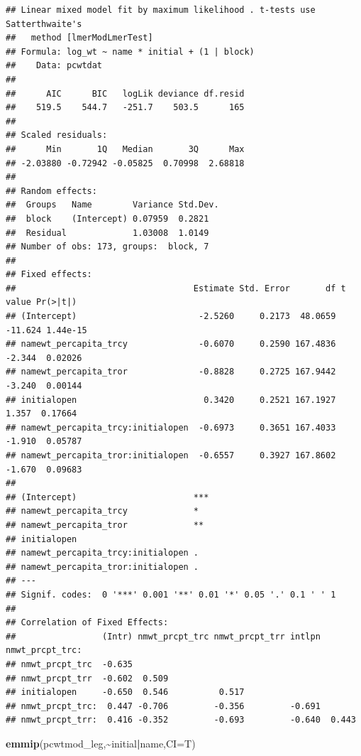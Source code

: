 \documentclass[
]{article}
\newenvironment{Shaded}{\begin{snugshade}}{\end{snugshade}}
\newcommand{\AttributeTok}[1]{\textcolor[rgb]{0.13,0.29,0.53}{#1}}
\newcommand{\FunctionTok}[1]{\textcolor[rgb]{0.13,0.29,0.53}{\textbf{#1}}}
\newcommand{\NormalTok}[1]{#1}
\newcommand{\SpecialCharTok}[1]{\textcolor[rgb]{0.81,0.36,0.00}{\textbf{#1}}}
\begin{document}
\begin{verbatim}
## Linear mixed model fit by maximum likelihood . t-tests use Satterthwaite's
##   method [lmerModLmerTest]
## Formula: log_wt ~ name * initial + (1 | block)
##    Data: pcwtdat
## 
##      AIC      BIC   logLik deviance df.resid 
##    519.5    544.7   -251.7    503.5      165 
## 
## Scaled residuals: 
##      Min       1Q   Median       3Q      Max 
## -2.03880 -0.72942 -0.05825  0.70998  2.68818 
## 
## Random effects:
##  Groups   Name        Variance Std.Dev.
##  block    (Intercept) 0.07959  0.2821  
##  Residual             1.03008  1.0149  
## Number of obs: 173, groups:  block, 7
## 
## Fixed effects:
##                                   Estimate Std. Error       df t value Pr(>|t|)
## (Intercept)                        -2.5260     0.2173  48.0659 -11.624 1.44e-15
## namewt_percapita_trcy              -0.6070     0.2590 167.4836  -2.344  0.02026
## namewt_percapita_tror              -0.8828     0.2725 167.9442  -3.240  0.00144
## initialopen                         0.3420     0.2521 167.1927   1.357  0.17664
## namewt_percapita_trcy:initialopen  -0.6973     0.3651 167.4033  -1.910  0.05787
## namewt_percapita_tror:initialopen  -0.6557     0.3927 167.8602  -1.670  0.09683
##                                      
## (Intercept)                       ***
## namewt_percapita_trcy             *  
## namewt_percapita_tror             ** 
## initialopen                          
## namewt_percapita_trcy:initialopen .  
## namewt_percapita_tror:initialopen .  
## ---
## Signif. codes:  0 '***' 0.001 '**' 0.01 '*' 0.05 '.' 0.1 ' ' 1
## 
## Correlation of Fixed Effects:
##                 (Intr) nmwt_prcpt_trc nmwt_prcpt_trr intlpn nmwt_prcpt_trc:
## nmwt_prcpt_trc  -0.635                                                     
## nmwt_prcpt_trr  -0.602  0.509                                              
## initialopen     -0.650  0.546          0.517                               
## nmwt_prcpt_trc:  0.447 -0.706         -0.356         -0.691                
## nmwt_prcpt_trr:  0.416 -0.352         -0.693         -0.640  0.443
\end{verbatim}

\begin{Shaded}
\begin{Highlighting}[]
\FunctionTok{emmip}\NormalTok{(pcwtmod\_leg,}\SpecialCharTok{\textasciitilde{}}\NormalTok{initial}\SpecialCharTok{|}\NormalTok{name,}\AttributeTok{CI=}\NormalTok{T)}
\end{Highlighting}
\end{Shaded}
\end{document}
